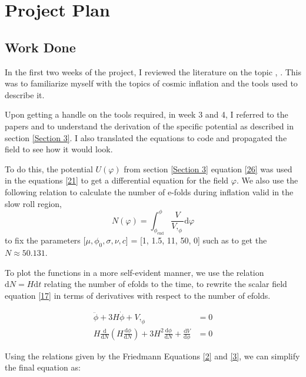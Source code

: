 \documentclass[aps,prd,reprint,preprintnumbers,showpacs,floatfix,nofootinbib,superscript address]{revtex4-2}
\begin{document}
\section{Project Plan}

\subsection{Work Done}

In the first two weeks of the project, I reviewed the literature on the topic \cite{Mukhanov:2005sc}, \cite{baumann2012tasilecturesinflation}. This was to familiarize myself with the topics of cosmic inflation and the tools used to describe it. 

Upon getting a handle on the tools required, in week 3 and 4, I referred to the papers \cite{barker2024poincaregaugetheoryconformal} and \cite{Salvio_2022} to understand the derivation of the specific potential as described in section \ref{Section 3}. I also translated the equations to code and propagated the field to see how it would look.

To do this, the potential $U(\varphi)$ from section \ref{Section 3} equation \ref{26} was used in the equations \ref{21} to get a differential equation for the field $\varphi$. We also use the following relation to calculate the number of e-folds during inflation valid in the slow roll region,
\begin{equation}
    N(\varphi) = \int_{\phi_\text{end}}^{\phi} \frac{V}{V,_{\phi}} \mathrm{d}\varphi
\end{equation}
to fix the parameters [$\mu,\phi_0,\sigma,\nu,c$] = [1, 1.5, 11, 50, 0] such as to get the $N \approx 50.131$.

To plot the functions in a more self-evident manner, we use the relation $\mathrm{d}N = H \mathrm{d}t$ relating the number of efolds to the time, to rewrite the scalar field equation \ref{17} in terms of derivatives with respect to the number of efolds.

\begin{align}
    \ddot{\phi} + 3H\dot{\phi} + V,_\phi &= 0 
    \\
    H \frac{\mathrm{d}}{\mathrm{d}N} \left(H \frac{\mathrm{d}\phi}{\mathrm{d}N} \right) + 3 H^2 \frac{\mathrm{d}\phi}{\mathrm{d}N} + \frac{\mathrm{d}V}{\mathrm{d}\phi} &= 0    
\end{align}

Using the relations given by the Friedmann Equations \ref{2} and \ref{3}, we can simplify the final equation as:
\end{document}

